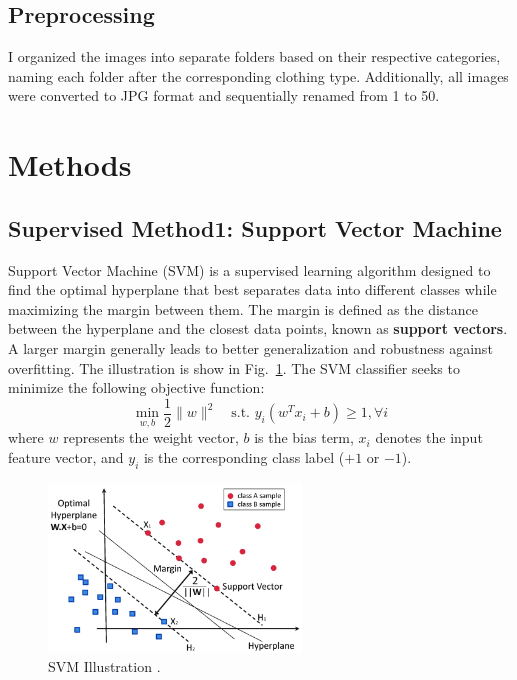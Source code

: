 \documentclass[12pt]{article}
\begin{document}
    \subsection{Preprocessing}
    I organized the images into separate folders based on their respective categories, naming each folder after the corresponding clothing type. Additionally, all images were converted to JPG format and sequentially renamed from 1 to 50.
    
\section{Methods}  
    \subsection{Supervised Method1: Support Vector Machine}  
    Support Vector Machine (SVM) is a supervised learning algorithm designed to find the optimal hyperplane that best separates data into different classes while maximizing the margin between them. The margin is defined as the distance between the hyperplane and the closest data points, known as \textbf{support vectors}. A larger margin generally leads to better generalization and robustness against overfitting. The illustration is show in Fig.~\ref{fig:svm}. The SVM classifier seeks to minimize the following objective function:  
    \begin{equation*}
        \min_{w, b} \frac{1}{2} \|w\|^2 \quad \text{s.t. } y_i (w^T x_i + b) \geq 1, \forall i
    \end{equation*}  
    where \( w \) represents the weight vector, \( b \) is the bias term, \( x_i \) denotes the input feature vector, and \( y_i \) is the corresponding class label (\(+1\) or \(-1\)).
    
    \begin{figure}[h]
        \centering
        \includegraphics[width=0.6\textwidth]{svm.png}
        \caption{SVM Illustration \cite{svm_medium}.} 
        \label{fig:svm}
    \end{figure}
    
\end{document}
